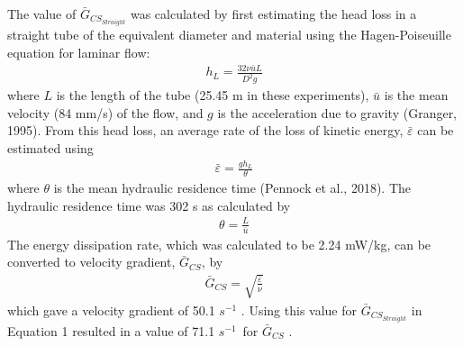\documentclass[letterpaper,10pt,english]{sphinxmanual}
\begin{document}
The value of \({\bar G_{CS_{Straight}}}\) was calculated by first estimating the head loss in a straight tube of the equivalent diameter and material using the Hagen-Poiseuille equation for laminar flow:
\begin{equation}\label{equation:Flocculation/Floc_Model:Flocculation/Floc_Model:10}
\begin{split}h_{L}=\frac{32\nu \bar{u}L}{D^2g}\end{split}
\end{equation}
where \(L\) is the length of the tube (25.45 m in these experiments), \(\bar{u}\) is the mean velocity (84 mm/s) of the flow, and \(g\) is the acceleration due to gravity (Granger, 1995). From this head loss, an average rate of the loss of kinetic energy, \(\bar{\varepsilon }\) can be estimated using
\begin{equation}\label{equation:Flocculation/Floc_Model:Flocculation/Floc_Model:11}
\begin{split}\bar{\varepsilon }=\frac{gh_{L}}{\theta }\end{split}
\end{equation}
where \(\theta\) is the mean hydraulic residence time (Pennock et al., 2018). The hydraulic residence time was 302 s as calculated by
\begin{equation}\label{equation:Flocculation/Floc_Model:Flocculation/Floc_Model:12}
\begin{split}\theta =\frac{L}{\bar{u}}\end{split}
\end{equation}
The energy dissipation rate, which was calculated to be 2.24 mW/kg, can be converted to velocity gradient, \(\bar G_{CS}\), by
\begin{equation}\label{equation:Flocculation/Floc_Model:Flocculation/Floc_Model:13}
\begin{split}\bar G_{CS}=\sqrt{\frac{\bar{\varepsilon }}{\nu }}\end{split}
\end{equation}
which gave a velocity gradient of 50.1 \({s}^{-1}\) . Using this value for \({\bar G_{CS_{Straight}}}\) in Equation 1 resulted in a value of 71.1 \({s}^{-1\ }\) for \(\bar G_{CS}\) .
\end{document}
